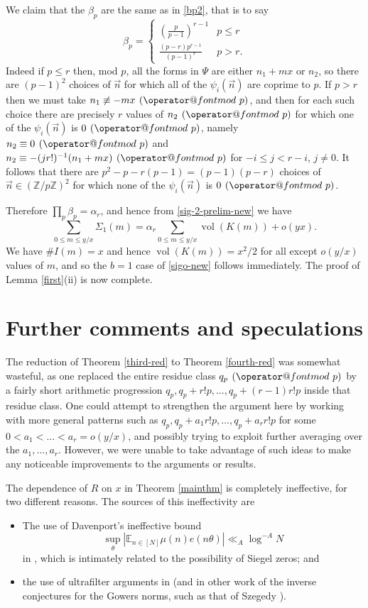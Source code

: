 \documentclass[12pt]{amsart}
\makeatletter
\numberwithin{equation}{section}  %
\theoremstyle{remark}
\theoremstyle{plain}
\numberwithin{equation}{section}
\newcommand{\Z}{\mathbb{Z}}
\newcommand{\E}{\mathbb{E}}  %
\renewcommand{\pmod}[1]{\allowbreak\mkern7mu({\operator@font mod}\,\,#1)}
\renewcommand{\leq}{\leqslant}
\renewcommand{\(}{\left(}
\renewcommand{\)}{\right)}
\newcommand{\vect}[1]{{\ensuremath{\vec{#1}}}}
\newcommand{\vol}{\operatorname{vol}}
\makeatother
\begin{document}
We claim that the $\beta_p$ are the same as in \eqref{bp2}, that is to say
\[ \beta_p = \left\{ \begin{array}{ll} (\frac{p}{p-1})^{r-1} & p \leq
  r \\ \frac{(p-r)p^{r-1}}{(p-1)^r} & p > r.\end{array}  \right. \]
Indeed if $p \leq r$ then, mod $p$, all the forms in $\Psi$ are either $n_1 + mx$ or $n_2$, so there are $(p-1)^2$ choices of $\vect{n}$ for which all of the $\psi_i(\vect{n})$ are coprime to $p$. If $p > r$ then we must take $n_1 \not\equiv -mx \pmod{p}$, and then for each such choice there are precisely $r$ values of $n_2 \pmod{p}$ for which one of the $\psi_i(\vect{n})$ is $0 \pmod{p}$, namely $n_2 \equiv 0\pmod{p}$ and $n_2 \equiv -(jr!)^{-1} (n_1 + mx) \pmod{p}$ for $-i \leq j < r-i$, $j \neq 0$. It follows that there are $p^2 - p - r(p-1) = (p-1)(p-r)$ choices of $\vect{n} \in (\Z/p\Z)^2$ for which none of the $\psi_i(\vect{n})$ is $0 \pmod{p}$.

Therefore $\prod_p \beta_p = \alpha_r$, and hence from \eqref{sig-2-prelim-new} we have
\[ \sum_{0 \leq m \leq y/x} \Sigma_1(m) = \alpha_r \sum_{0 \leq m \leq y/x} \vol(K(m)) + o(y x).\]
We have $\# I(m) = x$ and hence $\vol(K(m)) = x^2/2$ for all except $o(y/x)$ values of $m$, and so the $b=1$ case of \eqref{sigo-new} follows immediately.  The proof of Lemma \ref{first}(ii) is now complete.

\section{Further comments and speculations}

The reduction of Theorem \ref{third-red} to Theorem \ref{fourth-red} was somewhat wasteful, as one replaced the entire residue class $q_p \pmod{p}$ by a fairly short arithmetic progression $q_p, q_p+r!p,\dots, q_p+(r-1)r!p$ inside that residue class.  One could attempt to strengthen the argument here by working with more general patterns such as $q_p, q_p + a_1 r! p, \dots, q_p + a_r r! p$ for some $0 < a_1 < \dots < a_r = o(y/x)$, and possibly trying to exploit further averaging over the $a_1,\dots,a_r$.  However, we were unable to take advantage of such ideas to make any noticeable improvements to the arguments or results.

The dependence of $R$ on $x$ in Theorem \ref{mainthm} is completely ineffective, for two different reasons. The sources of this ineffectivity are
\begin{itemize}
\item The use of Davenport's ineffective bound
\[ \sup_{\theta} |\E_{n \in [N]} \mu(n) e(n \theta)| \ll_A \log^{-A} N\] in \cite{gt-nilmobius}, which is intimately related to the possibility of Siegel zeros; and
\item the use of ultrafilter arguments in \cite{GTZ} (and in other work of the inverse conjectures for the Gowers norms, such as that of Szegedy \cite{szegedy}).
\end{itemize}
\end{document}
